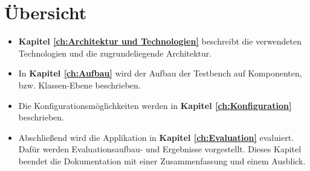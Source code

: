 \section{Übersicht}
\begin{itemize}
	\item \textbf{Kapitel \ref{ch:Architektur und Technologien}} beschreibt die verwendeten Technologien und die zugrundeliegende Architektur.
	
	\item In \textbf{Kapitel \ref{ch:Aufbau}} wird der Aufbau der Testbench auf Komponenten, bzw. Klassen-Ebene beschrieben. 
	\item Die Konfigurationsmöglichkeiten werden in \textbf{Kapitel \ref{ch:Konfiguration}} beschrieben.
	
	\item Abschließend wird die Applikation in \textbf{Kapitel \ref{ch:Evaluation} }evaluiert. Dafür werden Evaluationsaufbau- und Ergebnisse vorgestellt. Dieses Kapitel beendet die Dokumentation mit einer Zusammenfassung und einem Ausblick.
\end{itemize}

 



